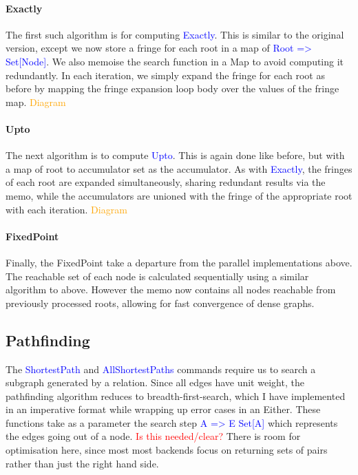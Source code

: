 \documentclass[12pt,a4paper,twoside,openright]{report}
\newcommand\todo[1]{\textcolor{red}{#1}}
\newcommand\codeName[1]{\textcolor{blue}{#1}}
\newcommand\diagramNeeded[1]{\textcolor{orange}{#1}}
\begin{document}
{{		\paragraph{Exactly}
The first such algorithm is for computing \codeName{Exactly}. This is similar to the original version, except we now store a fringe for each root in a map of \codeName{Root => Set[Node]}. We also memoise the search function in a Map to avoid computing it redundantly. In each iteration, we simply expand the fringe for each root as before by mapping the fringe expansion loop body over the values of the fringe map. \diagramNeeded{Diagram}
		
		\paragraph{Upto}
The next algorithm is to compute \codeName{Upto}. This is again done like before, but with a map of root to accumulator set as the accumulator. As with \codeName{Exactly}, the fringes of each root are expanded simultaneously, sharing redundant results via the memo, while the accumulators are unioned with the fringe of the appropriate root with each iteration. \diagramNeeded{Diagram}
		
		\paragraph{FixedPoint}
Finally, the FixedPoint take a departure from the parallel implementations above. The reachable set of each node is calculated sequentially using a similar algorithm to above. However the memo now contains all nodes reachable from previously processed roots, allowing for fast convergence of dense graphs.	
	
	\subsection{Pathfinding}
	The \codeName{ShortestPath} and \codeName{AllShortestPaths} commands require us to search a subgraph generated by a relation. Since all edges have unit weight, the pathfinding algorithm reduces to breadth-first-search, which I have implemented in an imperative format while wrapping up error cases in an Either. These functions take as a parameter the search step \codeName{A => E \/ Set[A]} which represents the edges going out of a node.  \todo{Is this needed/clear?} There is room for optimisation here, since most most backends focus on returning sets of pairs rather than just the right hand side.
}}
\end{document}
